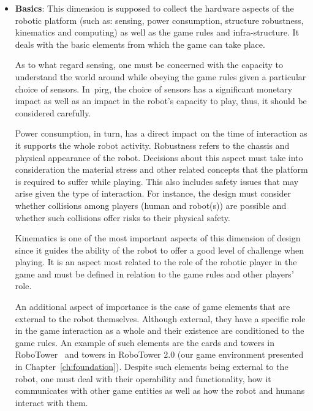\begin{itemize}[leftmargin=*,labelsep=5.8mm]
\item \textbf{Basics}: This dimension is supposed to collect the hardware aspects of the robotic platform (such as: sensing, power consumption, structure robustness, kinematics and computing) as well as the game rules and infra-structure. It deals with the basic elements from which the game can take place.

As to what regard sensing, one must be concerned with the capacity to understand the world around while obeying the game rules given a particular choice of sensors. In~\gls{pirg}, the choice of sensors has a significant monetary impact as well as an impact in the robot's capacity to play, thus, it should be considered carefully.

Power consumption, in turn, has a direct impact on the time of interaction as it supports the whole robot activity. Robustness refers to the chassis and physical appearance of the robot. Decisions about this aspect must take into consideration the material stress and other related concepts that the platform is required to suffer while playing. This also includes safety issues that may arise given the type of interaction. For instance, the design must consider whether collisions among players (human and robot(s)) are possible and whether such collisions offer risks to their physical safety. 

Kinematics is one of the most important aspects of this dimension of design since it guides the ability of the robot to offer a good level of challenge when playing. It is an aspect most related to the role of the robotic player in the game and must be defined in relation to the game rules and other players' role. 

An additional aspect of importance is the case of game elements that are external to the robot themselves. Although external, they have a specific role in the game interaction as a whole and their existence are conditioned to the game rules. An example of such elements are the cards and towers in RoboTower~\citep{bonarini_timing_2014} and towers in RoboTower 2.0 (our game environment presented in Chapter~\ref{ch:foundation}). Despite such elements being external to the robot, one must deal with their operability and functionality, how it communicates with other game entities as well as how the robot and humans interact with them.


\end{itemize}
